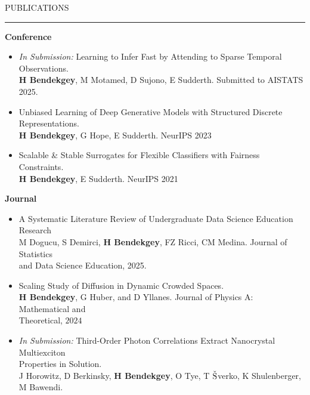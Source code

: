 \documentclass{resume} %
\renewenvironment{rSection}[1]{
\sectionskip
\textcolor{CarnegieMellonRed}{\MakeUppercase{#1}}
\sectionlineskip
\hrule
\begin{list}{}{
\setlength{\leftmargin}{1.5em}
}
\item[]
}{
\end{list}
}
\begin{document}
\newpage
\begin{rSection}{Publications} \itemsep -2pt
{\bf Conference}
\begin{itemize}
	\item \emph{In Submission:} Learning to Infer Fast by Attending to Sparse Temporal Observations.\\
        {\bf H Bendekgey}, M Motamed, D Sujono, E Sudderth. Submitted to AISTATS 2025.

	\item Unbiased Learning of Deep Generative Models with Structured Discrete
Representations.\\
		{\bf H Bendekgey}, G Hope, E Sudderth. NeurIPS 2023
	\item Scalable \& Stable Surrogates for Flexible Classifiers with Fairness Constraints.\\
		{\bf H Bendekgey}, E Sudderth. NeurIPS 2021
\end{itemize}
\vspace{1.0em}
{\bf Journal}
\begin{itemize}
	\item A Systematic Literature Review of Undergraduate Data Science Education Research\\
		M Dogucu, S Demirci, {\bf H Bendekgey}, FZ Ricci, CM Medina. Journal of Statistics\\ and Data Science Education, 2025.
	\item Scaling Study of Diffusion in Dynamic Crowded Spaces.\\
	      {\bf H Bendekgey}, G Huber, and D Yllanes. Journal of Physics A: Mathematical and \\ Theoretical, $2024$
	\item \emph{In Submission:} Third-Order Photon Correlations Extract Nanocrystal Multiexciton \\Properties in Solution.\\
        J Horowitz, D Berkinsky, {\bf H Bendekgey}, O Tye, T $\check{\textnormal{S}}$verko, K Shulenberger, M Bawendi.	
\end{itemize}
\end{rSection}
\end{document}
